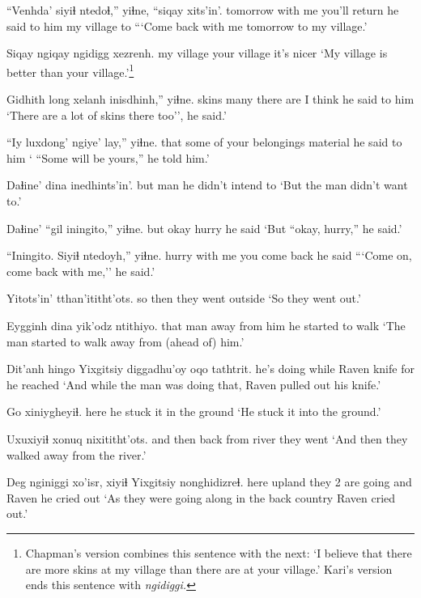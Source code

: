 \documentclass[12pt]{article}
\begin{document}
\gll ``Venhda' siyiɬ  ntedoɬ,'' yiɬne,  ``siqay xits'in'.
tomorrow {with me} {you'll return} {he said to him} {my village} to
\glt ```Come back with me tomorrow to my village.'
\glend

\gll Siqay  ngiqay {ngidigg xezrenh.}
{my village} {your village} {it's nicer}
\glt `My village is better than your village.'\footnote{Chapman's version combines this sentence with the next: `I believe that there are more skins at my village than there are at your village.' Kari's version ends this sentence with \em ngidiggi.}
\glend

\gll Gidhith long xelanh inisdhinh,'' yiɬne.
skins  many {there are} {I think} {he said to him}
\glt `There are a lot of skins there too'', he said.'
\glend

\gll ``Iy luxdong' ngiye'  lay,'' yiɬne.
that {some of} {your belongings} material {he said to him}
\glt ` ``Some will be yours,'' he told him.'
\glend

\gll Daɬine' dina inedhints'in'.
but  man {he didn't intend to}
\glt `But the man didn't want to.'
\glend

\gll Daɬine' ``gil iningito,'' yiɬne.
but  okay hurry  {he said}
\glt `But ``okay, hurry,'' he said.'
\glend

\gll ``Iningito. Siyiɬ  ntedoyh,'' yiɬne.
hurry {with me} {you come back} {he said}
\glt ```Come on, come back with me,'' he said.'
\glend

\gll Yitots'in' tthan'ititht'ots. 
{so then}  {they went outside}
\glt `So they went out.'
\glend

\gll Eygginh dina yik'odz ntithiyo. 
that  man {away from him} {he started to walk} 
\glt `The man started to walk away from (ahead of) him.'
\glend

\gll Dit'anh hingo Yixgitsiy diggadhu'oy  oqo tathtrit.
{he's doing} while Raven  knife for {he reached}
\glt `And while the man was doing that, Raven pulled out his knife.'
\glend

\gll Go xiniygheyiɬ.
here {he stuck it in the ground}
\glt `He stuck it into the ground.'
\glend

\gll Uxuxiyiɬ xonuq  nixititht'ots.
{and then} {back from river} {they went}
\glt `And then they walked away from the river.'
\glend

\gll Deg nginiggi xo'isr, xiyiɬ Yixgitsiy nonghidizreɬ.
here upland {they 2 are going} and Raven {he cried out}
\glt `As they were going along in the back country Raven cried out.'
\glend
\end{document}
